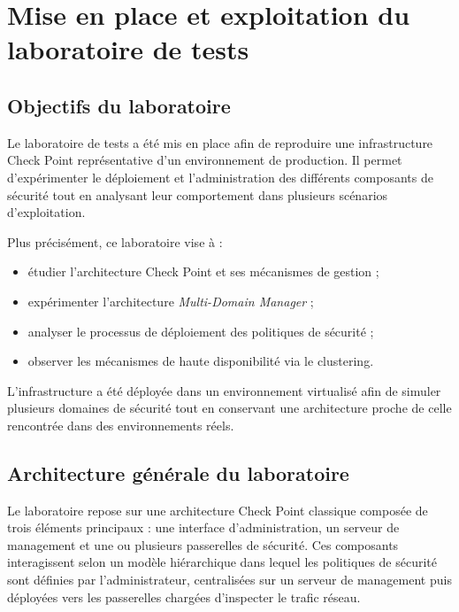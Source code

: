 \section{Mise en place et exploitation du laboratoire de tests}

\subsection{Objectifs du laboratoire}

Le laboratoire de tests a été mis en place afin de reproduire une
infrastructure Check Point représentative d’un environnement de
production. Il permet d’expérimenter le déploiement et
l’administration des différents composants de sécurité tout en
analysant leur comportement dans plusieurs scénarios
d’exploitation.

Plus précisément, ce laboratoire vise à :

\begin{itemize}
    \item étudier l’architecture Check Point et ses mécanismes de gestion ;
    \item expérimenter l’architecture \textit{Multi-Domain Manager} ;
    \item analyser le processus de déploiement des politiques de sécurité ;
    \item observer les mécanismes de haute disponibilité via le clustering.
\end{itemize}

L’infrastructure a été déployée dans un environnement virtualisé
afin de simuler plusieurs domaines de sécurité tout en conservant
une architecture proche de celle rencontrée dans des
environnements réels.


\subsection{Architecture générale du laboratoire}

Le laboratoire repose sur une architecture Check Point classique
composée de trois éléments principaux : une interface
d’administration, un serveur de management et une ou plusieurs
passerelles de sécurité. Ces composants interagissent selon un
modèle hiérarchique dans lequel les politiques de sécurité sont
définies par l’administrateur, centralisées sur un serveur de
management puis déployées vers les passerelles chargées
d’inspecter le trafic réseau.

